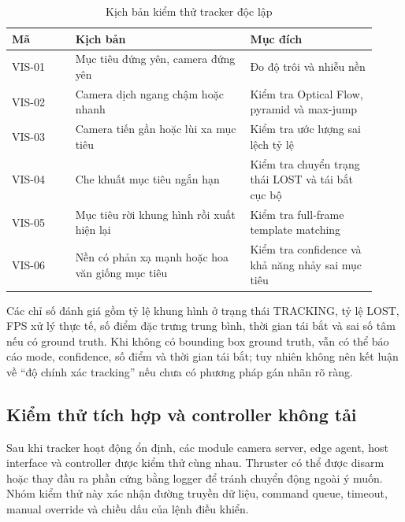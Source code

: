\documentclass[../DoAn.tex]{subfiles}
\begin{document}
\begin{table}[htbp]
    \centering
    \caption{Kịch bản kiểm thử tracker độc lập}
    \label{tab:kiemthu_tracker}
    \renewcommand{\arraystretch}{1.25}
    \begin{tabular}{|p{0.16\linewidth}|p{0.44\linewidth}|p{0.32\linewidth}|}
        \hline
        \textbf{Mã} & \textbf{Kịch bản} & \textbf{Mục đích} \\
        \hline
        VIS-01 & Mục tiêu đứng yên, camera đứng yên & Đo độ trôi và nhiễu nền \\
        \hline
        VIS-02 & Camera dịch ngang chậm hoặc nhanh & Kiểm tra Optical Flow, pyramid và max-jump \\
        \hline
        VIS-03 & Camera tiến gần hoặc lùi xa mục tiêu & Kiểm tra ước lượng sai lệch tỷ lệ \\
        \hline
        VIS-04 & Che khuất mục tiêu ngắn hạn & Kiểm tra chuyển trạng thái LOST và tái bắt cục bộ \\
        \hline
        VIS-05 & Mục tiêu rời khung hình rồi xuất hiện lại & Kiểm tra full-frame template matching \\
        \hline
        VIS-06 & Nền có phản xạ mạnh hoặc hoa văn giống mục tiêu & Kiểm tra confidence và khả năng nhảy sai mục tiêu \\
        \hline
    \end{tabular}
\end{table}

Các chỉ số đánh giá gồm tỷ lệ khung hình ở trạng thái TRACKING, tỷ lệ LOST, FPS xử lý thực tế, số điểm đặc trưng trung bình, thời gian tái bắt và sai số tâm nếu có ground truth. Khi không có bounding box ground truth, vẫn có thể báo cáo mode, confidence, số điểm và thời gian tái bắt; tuy nhiên không nên kết luận về ``độ chính xác tracking'' nếu chưa có phương pháp gán nhãn rõ ràng.

\subsection{Kiểm thử tích hợp và controller không tải}

Sau khi tracker hoạt động ổn định, các module camera server, edge agent, host interface và controller được kiểm thử cùng nhau. Thruster có thể được disarm hoặc thay đầu ra phần cứng bằng logger để tránh chuyển động ngoài ý muốn. Nhóm kiểm thử này xác nhận đường truyền dữ liệu, command queue, timeout, manual override và chiều dấu của lệnh điều khiển.
\end{document}

